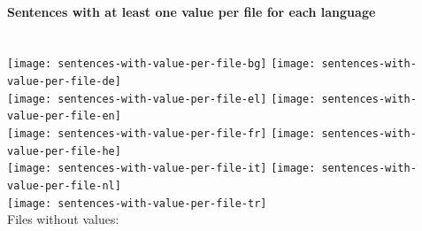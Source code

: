 \documentclass[a4paper]{article}
\newenvironment{figures}[1]{\noindent\begin{minipage}{\linewidth}\paragraph{#1}\noindent\\[\baselineskip]}{\end{minipage}}
\begin{document}
\begin{figures}{Sentences with at least one value per file for each language}
\texttt{[image: sentences-with-value-per-file-bg]}%
\hfill%
\texttt{[image: sentences-with-value-per-file-de]}\\[4ex]
\texttt{[image: sentences-with-value-per-file-el]}%
\hfill%
\texttt{[image: sentences-with-value-per-file-en]}\\[4ex]
\texttt{[image: sentences-with-value-per-file-fr]}%
\hfill%
\texttt{[image: sentences-with-value-per-file-he]}\\[4ex]
\texttt{[image: sentences-with-value-per-file-it]}%
\hfill%
\texttt{[image: sentences-with-value-per-file-nl]}\\[4ex]
\texttt{[image: sentences-with-value-per-file-tr]}\\

\noindent
Files without values: 
\end{figures}
\end{document}
